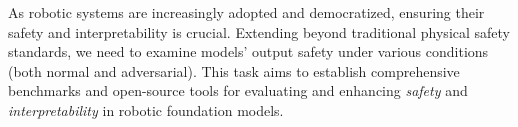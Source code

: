 { 
As robotic systems are increasingly adopted and democratized, ensuring their safety and interpretability is crucial. 
Extending beyond traditional physical safety standards, we need to examine models' output safety under various conditions (both normal and adversarial). 
This task aims to establish comprehensive benchmarks and open-source tools for evaluating and enhancing \emph{safety} and \emph{interpretability} in robotic foundation models. 






}
